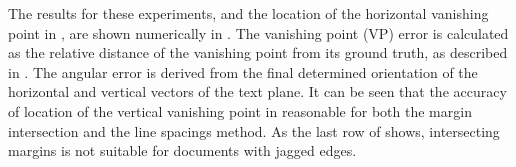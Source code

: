 
The results for these experiments, and the location of the horizontal vanishing
point in , are shown numerically in
. 
The vanishing point (VP) error is calculated as the relative distance of the
vanishing point from its ground truth, as described in . 
The angular error is derived from the final determined orientation of the
horizontal and vertical vectors of the text plane. 
It can be seen that the accuracy of location of the vertical vanishing point in
reasonable for both the margin intersection and the line spacings method. 
As the last row of  shows, intersecting margins is not
suitable for documents with jagged edges.


